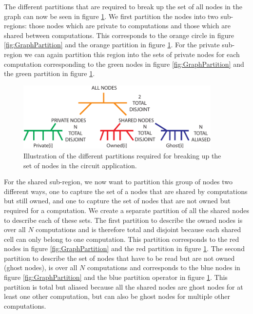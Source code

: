 \documentclass{article}
\theoremstyle{definition}
\begin{document}
\noindent
The different partitions that are required to break up the set of all nodes
in the graph can now be seen in figure \ref{fig:GraphPartitionGraph}.  We
first partition the nodes into two sub-regions: those nodes which are private
to computations and those which are shared between computations.  This
corresponds to the orange circle in figure \ref{fig:GraphPartition} and
the orange partition in figure \ref{fig:GraphPartitionGraph}.  For the 
private sub-region we can again partition this region into the sets of private
nodes for each computation corresponding to the green nodes in figure 
\ref{fig:GraphPartition} and the green partition in figure
\ref{fig:GraphPartitionGraph}.\\

\begin{figure}[t]
\centering
\includegraphics[width=4in]{figs/GraphPartitionGraph.pdf}
\caption{Illustration of the different partitions required for
breaking up the set of nodes in the circuit application.
\label{fig:GraphPartitionGraph}}
\end{figure}

\noindent
For the shared sub-region, we now want to partition this group of nodes two
different ways, one to capture the set of a nodes that are shared by computations
but still owned, and one to capture the set of nodes that are not owned but
required for a computation.  We create a separate partition of all the shared
nodes to describe each of these sets.  The first partition to describe the owned
nodes is over all $N$ computations and is therefore total and disjoint because each shared
cell can only belong to one computation.  This partition corresponds to the
red nodes in figure \ref{fig:GraphPartition} and the red partition in figure
\ref{fig:GraphPartitionGraph}.  The second partition to describe the set of nodes
that have to be read but are not owned (ghost nodes), is over all $N$ computations
and corresponds to the blue nodes in figure \ref{fig:GraphPartition} and the blue 
partition operator in figure \ref{fig:GraphPartitionGraph}.  This partition is
total but aliased because all the shared nodes are ghost nodes for at least one
other computation, but can also be ghost nodes for multiple other computations.\\
\end{document}
